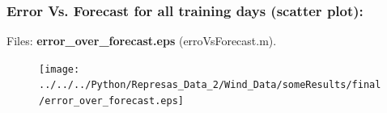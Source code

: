 \documentclass[aspectratio=169]{beamer}\usepackage[utf8]{inputenc}
\begin{document}
%
%
%


\begin{frame}\frametitle{Error Vs. Forecast for all training days (scatter plot):}
Files: \textbf{error\_over\_forecast.eps} (erroVsForecast.m).

\begin{figure}[ht!]
\centering
\texttt{[image: ../../../Python/Represas\_Data\_2/Wind\_Data/someResults/final/error\_over\_forecast.eps]}
\end{figure}

\end{frame}
\end{document}
